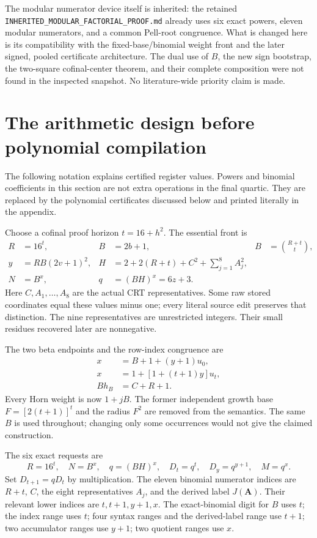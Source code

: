 \documentclass[11pt]{article}
\theoremstyle{remark}\newtheorem{remark}[theorem]{Remark}
\begin{document}


The modular numerator device itself is inherited: the retained
\nolinkurl{INHERITED_MODULAR_FACTORIAL_PROOF.md} already uses six exact
powers, eleven modular numerators, and a common Pell-root congruence.
What is changed here is its compatibility with the fixed-base/binomial
weight front and the later signed, pooled certificate architecture.
The dual use of $B$, the new sign bootstrap, the two-square cofinal-center
theorem, and their complete composition were not found in the inspected
snapshot. No literature-wide priority claim is made.

\section{The arithmetic design before polynomial compilation}

The following notation explains certified register values. Powers and
binomial coefficients in this section are not extra operations in the
final quartic. They are replaced by the polynomial certificates discussed
below and printed literally in the appendix.

Choose a cofinal proof horizon $t=16+h^2$. The essential front is
\begin{align}
 R&=16^t,& B&=2b+1,& B&=\binom{R+t}{t},\label{eq:front1}\\
 y&=RB(2v+1)^2,&
 H&=2+2(R+t)+C^2+\sum_{j=1}^{8}A_j^2,\label{eq:front2}\\
 N&=B^x,& q&=(BH)^x=6z+3.&\label{eq:front3}
\end{align}
Here $C,A_1,\ldots,A_8$ are the actual CRT representatives. Some raw
stored coordinates equal these values minus one; every literal source
edit preserves that distinction. The nine representatives are unrestricted
integers. Their small residues recovered later are nonnegative.

The two beta endpoints and the row-index congruence are
\begin{align}
 x&=B+1+(y+1)u_0,\label{eq:initial}\\
 x&=1+[1+(t+1)y]u_t,\label{eq:final}\\
 B h_B&=C+R+1.\label{eq:index}
\end{align}
Every Horn weight is now $1+jB$. The former independent growth base
$F=[2(t+1)]^t$ and the radius $F^2$ are removed from the semantics.
The same $B$ is used throughout; changing only some occurrences would
not give the claimed construction.

The six exact requests are
\begin{equation}\label{eq:six}
 R=16^t,\quad N=B^x,\quad q=(BH)^x,\quad
 D_t=q^t,\quad D_y=q^{y+1},\quad M=q^x.
\end{equation}
Set $D_{t+1}=qD_t$ by multiplication. The eleven binomial numerator
indices are $R+t$, $C$, the eight representatives $A_j$, and the
derived label $J(\boldsymbol A)$. Their relevant lower indices are
$t,t+1,y+1,x$. The exact-binomial digit for $B$ uses $t$;
the index range uses $t$; four syntax ranges and the derived-label
range use $t+1$; two accumulator ranges use $y+1$; two quotient
ranges use $x$.
\end{document}
